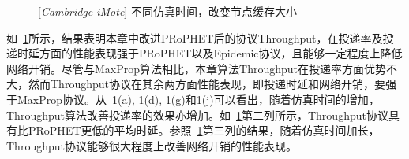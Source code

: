\begin{figure}[tbp]
\caption{[\emph{Cambridge-iMote}] 不同仿真时间，改变节点缓存大小}
\label{fig:chap4_trace_buffer}
\end{figure}

如\figurename~\ref{fig:chap4_trace_buffer}所示，结果表明本章中改进PRoPHET后的协议Throughput，在投递率及投递时延方面的性能表现强于PRoPHET以及Epidemic协议，且能够一定程度上降低网络开销。尽管与MaxProp算法相比，本章算法Throughput在投递率方面优势不大，然而Throughput协议在其余两方面性能表现，即投递时延和网络开销，要强于MaxProp协议。从\figurename~\ref{fig:chap4_trace_buffer}(a), \ref{fig:chap4_trace_buffer}(d), \ref{fig:chap4_trace_buffer}(g)和\ref{fig:chap4_trace_buffer}(j)可以看出，随着仿真时间的增加，Throughput算法改善投递率的效果亦增加。如\figurename~\ref{fig:chap4_trace_buffer}第二列所示，Throughput协议具有比PRoPHET更低的平均时延。参照\figurename~\ref{fig:chap4_trace_buffer}第三列的结果，随着仿真时间加长，Throughput协议能够很大程度上改善网络开销的性能表现。

